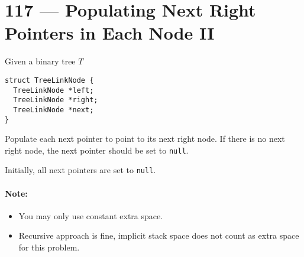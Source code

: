 \section{117 --- Populating Next Right Pointers in Each Node II}
Given a binary tree $T$
\begin{lstlisting}
struct TreeLinkNode {
  TreeLinkNode *left;
  TreeLinkNode *right;
  TreeLinkNode *next;
}
\end{lstlisting}
\par
Populate each next pointer to point to its next right node. If there is no next right node, the next pointer should be set to \texttt{null}.
\par
Initially, all next pointers are set to \texttt{null}.
\paragraph{Note:}
\begin{itemize}
    \item You may only use constant extra space.
    \item Recursive approach is fine, implicit stack space does not count as extra space for this problem.
\end{itemize}
